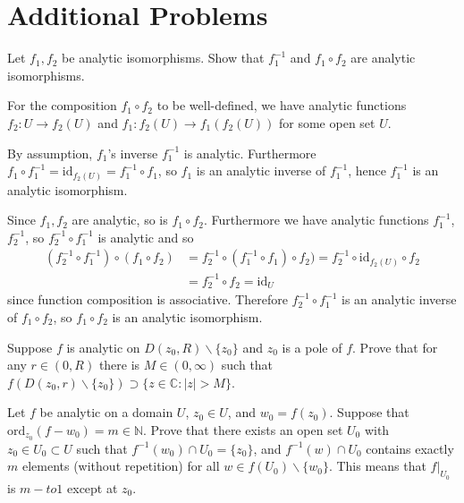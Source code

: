 \documentclass{article}
\newcommand\id{\mathrm{id}}
\newcommand\ord{\mathrm{ord}}
\newcounter{Problem}
\newenvironment{Problem}{\begin{Exercise}[name={Problem},
                                          counter={Problem}]}
                        {\end{Exercise}}
\begin{document}
\section{Additional Problems}
\begin{Problem}
Let $f_1, f_2$ be analytic isomorphisms. Show that
$f_1^{-1}$ and $f_1 \circ f_2$ are analytic isomorphisms.
\end{Problem}

\begin{Answer}
For the composition $f_1 \circ f_2$ to be well-defined,
we have analytic functions $f_2 : U \to f_2(U)$ and
$f_1 : f_2(U) \to f_1(f_2(U))$ for some open set $U$.

By assumption, $f_1$'s inverse $f_1^{-1}$ is analytic.
Furthermore $f_1 \circ f_1^{-1} = \id_{f_2(U)} = f_1^{-1} \circ f_1$,
so $f_1$ is an analytic inverse of $f_1^{-1}$, hence
$f_1^{-1}$ is an analytic isomorphism.

Since $f_1, f_2$ are analytic, so is $f_1 \circ f_2$.
Furthermore we have analytic functions $f_1^{-1}$, $f_2^{-1}$,
so $f_2^{-1} \circ f_1^{-1}$ is analytic and so
\begin{align*}
  (f_2^{-1} \circ f_1^{-1}) \circ (f_1 \circ f_2)
&= f_2^{-1} \circ (f_1^{-1} \circ f_1) \circ f_2)
 = f_2^{-1} \circ \id_{f_2(U)} \circ f_2 \\
&= f_2^{-1} \circ f_2
 = \id_U
\end{align*}
since function composition is associative. Therefore
$f_2^{-1} \circ f_1^{-1}$ is an analytic inverse of $f_1 \circ f_2$,
so $f_1 \circ f_2$ is an analytic isomorphism.
\end{Answer}

\begin{Problem}
Suppose $f$ is analytic on $D(z_0, R) \backslash \{ z_0 \}$
and $z_0$ is a pole of $f$. Prove that for any $r \in (0, R)$
there is $M \in (0, \infty)$ such that
$f(D(z_0, r) \backslash \{z_0\})
 \supset
 \{ z \in \mathbb{C} : |z| > M \}$.
\end{Problem}

\begin{Problem}
Let $f$ be analytic on a domain $U$, $z_0 \in U$, and $w_0 = f(z_0)$.
Suppose that $\ord_{z_0} (f - w_0) = m \in \mathbb{N}$. Prove that
there exists an open set $U_0$ with $z_0 \in U_0 \subset U$ such that
$f^{-1}(w_0) \cap U_0 = \{ z_0 \}$, and $f^{-1}(w) \cap U_0$ contains
exactly $m$ elements (without repetition) for all
$w \in f(U_0) \backslash \{ w_0 \}$. This means that $f|_{U_0}$ is
$m-to1$ except at $z_0$.
\end{Problem}
\end{document}
